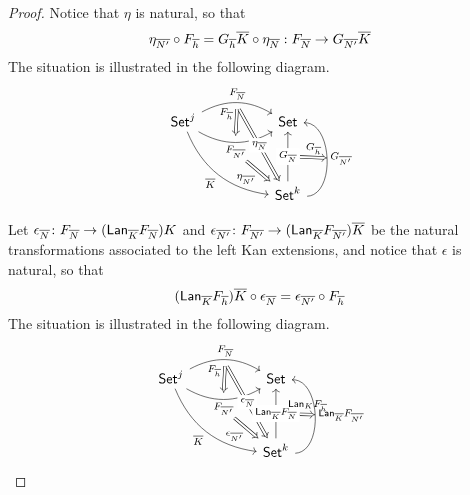\documentclass[acmsmall,review,anonymous]{acmart}
\theoremstyle{definition}
\begin{document}
\begin{proof}
Notice that \(\eta\) is natural, so that
\begin{equation*}\label{eq:lan-elim-eta-nat}
	\eta_{\overline{N'}} \circ F_{\overline{h}} = G_{\overline{h}} \overline{K} \circ \eta_{\overline{N}} : F_{\overline{N}} \to G_{\overline{N'}} \overline{K}
\end{equation*}
The situation is illustrated in the following diagram.
\[
\begin{tikzcd}[column sep = huge, row sep = huge]
\Set^j
\ar[r, bend left, "{F_{\ol N}}", ""{name=F, below}]
\ar[r, bend right, "{F_{\ol{N'}}}"{name=F'b, below}, ""{name=F'a, above}]
\ar[Rightarrow, from=F, to=F'a, "{F_{\ol{h}}}"']
\ar[dr, bend right, "{\ol K}"']
&\Set \\
&\Set^k
\ar[Rightarrow, from=F'b, "{\eta_{\ol{N'}}}"']
\ar[Rightarrow, from=F, "{\eta_{\ol N}}" description]
\ar[u, "{G_{\ol N}}"{name=L, description}]
\ar[u, bend right = 90, "{G_{\ol{N'}}}"{name=L', right}]
\ar[Rightarrow, from=L, to=L', "{G_{\ol h}}"]
\end{tikzcd}
\]

Let $\epsilon_{\overline{N}} \colon F_{\overline{N}} \to (\mathsf{Lan}_{\overline{K}} F_{\overline{N}}) K$ and $\epsilon_{\overline{N'}} \colon F_{\overline{N'}} \to (\mathsf{Lan}_{\overline{K}} F_{\overline{N'}}) \overline{K}$ be the natural transformations associated to the left Kan extensions, and notice that $\epsilon$ is natural, so that
\begin{equation}\label{eq:lan-elim-epsilon-nat}
	(\mathsf{Lan}_{\overline{K}} F_{\overline{h}}) \overline{K} \circ \epsilon_{\overline{N}} = \epsilon_{\overline{N'}} \circ F_{\overline{h}}
\end{equation}
The situation is illustrated in the following diagram.
\[
\begin{tikzcd}[column sep = huge, row sep = huge]
\Set^j
\ar[r, bend left, "{F_{\ol N}}", ""{name=F, below}]
\ar[r, bend right, "{F_{\ol{N'}}}"{name=F'b, below}, ""{name=F'a, above}]
\ar[Rightarrow, from=F, to=F'a, "{F_{\ol{h}}}"']
\ar[dr, bend right, "{\ol K}"']
&\Set \\
&\Set^k
\ar[Rightarrow, from=F'b, "{\epsilon_{\ol{N'}}}"']
\ar[Rightarrow, from=F, "{\epsilon_{\ol N}}" description]
\ar[u, "{\Lan_{\ol K} F_{\ol N}}"{name=L, description}]
\ar[u, bend right = 90, "{\Lan_{\ol K} F_{\ol{N'}}}"{name=L', right}]
\ar[Rightarrow, from=L, to=L', "{\Lan_K F_{\ol h}}"]
\end{tikzcd}
\]


\end{proof}
\end{document}
